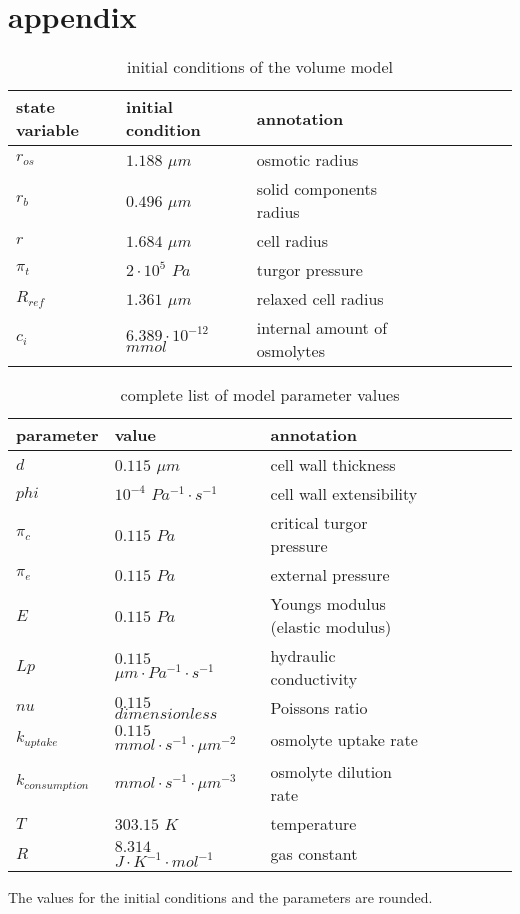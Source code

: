 \section{appendix}
\begin{table} [h]
	\footnotesize
	\begin{center} 
		\caption{initial conditions of the volume model}
		\begin{tabular} {l l l l l l l l}
		\toprule
	 	\textbf{state variable} & \textbf{initial condition} & \textbf{annotation}  \\
	 	\midrule
	 	$r_{os}$ & $1.188$ $\mu m$ & osmotic radius\\
	 	$r_{b}$ & $0.496$ $\mu m$ &solid components radius\\
	 	$r$ & $1.684$ $\mu m$ & cell radius\\
	 	$\pi_t$ & $2 \cdot 10^5$ $Pa$ & turgor pressure\\
	 	$R_{ref}$ & $1.361$ $\mu m$ & relaxed cell radius \\
	 	$c_{i}$ & $6.389 \cdot 10^{-12}$ $mmol$ & internal amount of osmolytes\\
	 	\bottomrule
		\end{tabular}
		\label{initCondVolume}
	\end{center}
\end{table}

\begin{table} [h]
	\footnotesize
	\begin{center} 
		\caption{complete list of model parameter values}
		\begin{tabular} {l l l l l l l l}
			\toprule
			\textbf{parameter} & \textbf{value} & \textbf{annotation}  \\
			\midrule
			$d$ & $0.115$ $\mu m$ & cell wall thickness\\
			$phi$ & $10^{-4}$ $Pa^{-1} \cdot s^{-1}$ & cell wall extensibility\\
			$\pi_c$ & $0.115$ $Pa$ & critical turgor pressure\\
			$\pi_e$ & $0.115$ $Pa$ & external pressure\\
			$E$ & $0.115$ $Pa$ & Youngs modulus (elastic modulus)\\
			$Lp$ & $0.115$ $\mu m \cdot Pa^{-1} \cdot s^{-1}$ & hydraulic conductivity\\
			$nu$ & $0.115$ $dimensionless$ & Poissons ratio\\
			$k_{uptake}$ & $0.115$ $mmol \cdot s^{-1} \cdot \mu m ^{-2} $ & osmolyte uptake rate\\
			$k_{consumption}$ & $mmol \cdot s^{-1} \cdot \mu m ^{-3} $ & osmolyte dilution rate\\
			$T$ & $303.15$ $K$ & temperature\\
			$R$ & $8.314$ $J \cdot K^{-1} \cdot mol^{-1}$ & gas constant \\
			\bottomrule
		\end{tabular}
		\label{parameterVolume}
	\end{center}
\end{table}
The values for the initial conditions and the parameters are rounded.

